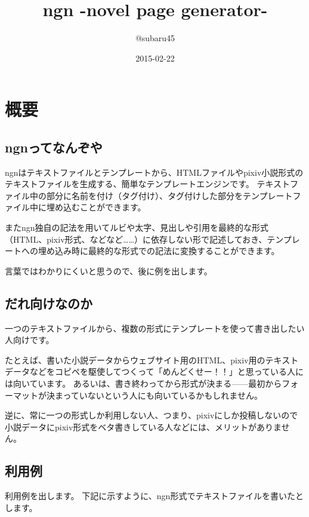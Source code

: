 \documentclass[a4j]{jsarticle}
\begin{document}
\title{ngn -novel page generator-}
\author{@subaru45}
\date{2015-02-22}
\maketitle


\section{概要}

\subsection{ngnってなんぞや}
ngnはテキストファイルとテンプレートから、HTMLファイルやpixiv小説形式のテキストファイルを生成する、簡単なテンプレートエンジンです。
テキストファイル中の部分に名前を付け（タグ付け）、タグ付けした部分をテンプレートファイル中に埋め込むことができます。

またngn独自の記法を用いてルビや太字、見出しや引用を最終的な形式（HTML、pixiv形式、などなど……）に依存しない形で記述しておき、テンプレートへの埋め込み時に最終的な形式での記法に変換することができます。

言葉ではわかりにくいと思うので、後に例を出します。


\subsection{だれ向けなのか}

一つのテキストファイルから、複数の形式にテンプレートを使って書き出したい人向けです。

たとえば、書いた小説データからウェブサイト用のHTML、pixiv用のテキストデータなどをコピペを駆使してつくって「めんどくせー！！」と思っている人には向いています。
あるいは、書き終わってから形式が決まる——最初からフォーマットが決まっていないという人にも向いているかもしれません。

逆に、常に一つの形式しか利用しない人、つまり、pixivにしか投稿しないので小説データにpixiv形式をベタ書きしている人などには、メリットがありません。


\subsection{利用例}


利用例を出します。
下記に示すように、ngn形式でテキストファイルを書いたとします。


\end{document}
